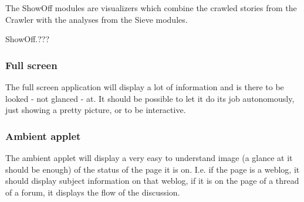 The ShowOff modules are visualizers which combine the crawled stories from the
Crawler with the analyses from the Sieve modules.

\begin{module}{ShowOff.???}
\end{module}

\subsubsection{Full screen}

The full screen application will display a lot of information and is there to
be looked - not glanced - at. It should be possible to let it do its job
autonomously, just showing a pretty picture, or to be interactive.

\subsubsection{Ambient applet}

The ambient applet will display a very easy to understand image (a glance at it
should be enough) of the status of the page it is on. I.e. if the page is a
weblog, it should display subject information on that weblog, if it is on the
page of a thread of a forum, it displays the flow of the discussion.

